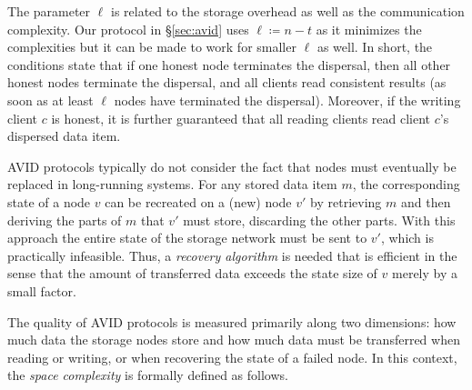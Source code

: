 \documentclass[sigconf,screen]{acmart}
\begin{document}
The parameter $\ell$ is related to the storage overhead as well as the communication complexity. Our protocol in \S\ref{sec:avid} uses $\ell \coloneqq n-t$ as it minimizes the complexities but it can be made to work for smaller $\ell$ as well.
In short, the conditions state that if one honest node terminates the dispersal, then all other honest nodes terminate the dispersal, and all clients read consistent results (as soon as at least $\ell$ nodes have terminated the dispersal). Moreover, if the writing client $c$ is honest, it is further guaranteed that all reading clients read client $c$'s dispersed data item.

AVID protocols typically do not consider the fact that nodes must eventually be replaced in long-running systems. For any stored data item $m$, the corresponding state of a node $v$ can be recreated on a (new) node $v'$ by retrieving $m$ and then deriving the parts of $m$ that $v'$ must store, discarding the other parts. With this approach the entire state of the storage network must be sent to $v'$, which is practically infeasible.
Thus, a \emph{recovery algorithm} is needed that is efficient in the sense that the amount of transferred data exceeds the state size of $v$ merely by a small factor.

The quality of AVID protocols is measured primarily along two dimensions: how much data the storage nodes store and how much data must be transferred when reading or writing, or when recovering the state of a failed node. In this context, the \emph{space complexity} is formally defined as follows.
\end{document}
